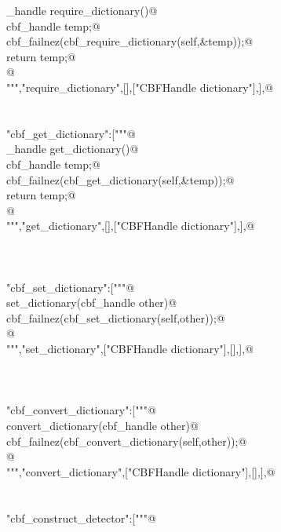 \documentclass[10pt,a4paper,twoside,notitlepage]{article}
\begin{document}
\begin{flushleft}
\begin{minipage}{\linewidth}
\begin{list}{}{}
\mbox{}\verb@cbf_handle require_dictionary(){@\\
\mbox{}\verb@   cbf_handle temp;@\\
\mbox{}\verb@   cbf_failnez(cbf_require_dictionary(self,&temp));@\\
\mbox{}\verb@   return temp;@\\
\mbox{}\verb@}@\\
\mbox{}\verb@""","require_dictionary",[],["CBFHandle dictionary"],],@\\
\mbox{}\verb@@\\
\mbox{}\verb@@\\
\mbox{}\verb@"cbf_get_dictionary":["""@\\
\mbox{}\verb@cbf_handle get_dictionary(){@\\
\mbox{}\verb@   cbf_handle temp;@\\
\mbox{}\verb@   cbf_failnez(cbf_get_dictionary(self,&temp));@\\
\mbox{}\verb@   return temp;@\\
\mbox{}\verb@}@\\
\mbox{}\verb@""","get_dictionary",[],["CBFHandle dictionary"],],@\\
\mbox{}\verb@@\\
\mbox{}\verb@@\\
\mbox{}\verb@@\\
\mbox{}\verb@"cbf_set_dictionary":["""@\\
\mbox{}\verb@void set_dictionary(cbf_handle other){@\\
\mbox{}\verb@   cbf_failnez(cbf_set_dictionary(self,other));@\\
\mbox{}\verb@}@\\
\mbox{}\verb@""","set_dictionary",["CBFHandle dictionary"],[],],@\\
\mbox{}\verb@@\\
\mbox{}\verb@@\\
\mbox{}\verb@@\\
\mbox{}\verb@"cbf_convert_dictionary":["""@\\
\mbox{}\verb@void convert_dictionary(cbf_handle other){@\\
\mbox{}\verb@   cbf_failnez(cbf_convert_dictionary(self,other));@\\
\mbox{}\verb@}@\\
\mbox{}\verb@""","convert_dictionary",["CBFHandle dictionary"],[],],@\\
\mbox{}\verb@@\\
\mbox{}\verb@@\\
\mbox{}\verb@"cbf_construct_detector":["""@\\

\end{list}
\end{minipage}
\end{flushleft}
\end{document}
